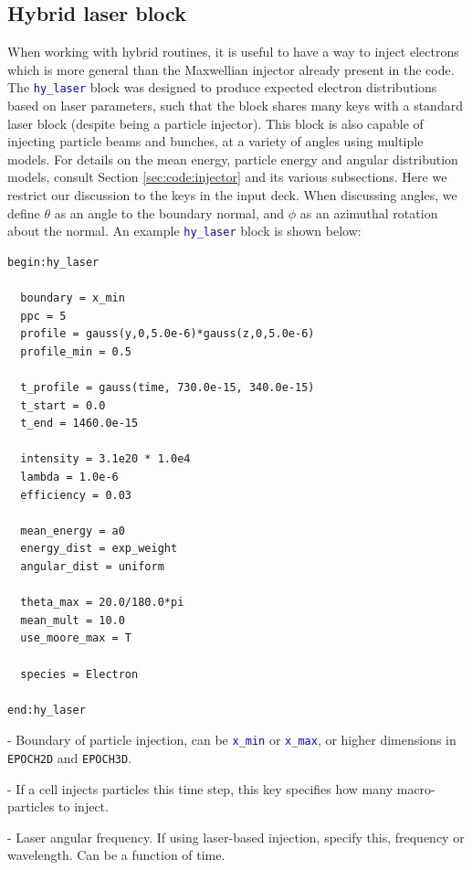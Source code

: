 \documentclass[12pt]{article}
\numberwithin{equation}{section}
\begin{document}
\subsection{Hybrid laser block} \label{sec:user:hy_laser}

When working with hybrid routines, it is useful to have a way to inject electrons which is more general than the Maxwellian injector already present in the code. The \textcolor{blue}{\texttt{hy\_laser}} block was designed to produce expected electron distributions based on laser parameters, such that the block shares many keys with a standard laser block (despite being a particle injector). This block is also capable of injecting particle beams and bunches, at a variety of angles using multiple models. For details on the mean energy, particle energy and angular distribution models, consult Section \ref{sec:code:injector} and its various subsections. Here we restrict our discussion to the keys in the input deck. When discussing angles, we define $\theta$ as an angle to the boundary normal, and $\phi$ as an azimuthal rotation about the normal. An example \textcolor{blue}{\texttt{hy\_laser}} block is shown below:

\begin{lstlisting}[style=myInputDeck]
begin:hy_laser

  boundary = x_min
  ppc = 5
  profile = gauss(y,0,5.0e-6)*gauss(z,0,5.0e-6)
  profile_min = 0.5

  t_profile = gauss(time, 730.0e-15, 340.0e-15)
  t_start = 0.0
  t_end = 1460.0e-15

  intensity = 3.1e20 * 1.0e4
  lambda = 1.0e-6
  efficiency = 0.03 

  mean_energy = a0
  energy_dist = exp_weight
  angular_dist = uniform

  theta_max = 20.0/180.0*pi
  mean_mult = 10.0
  use_moore_max = T

  species = Electron

end:hy_laser
\end{lstlisting}

\bigskip {\large\textcolor{blue}{boundary}} - Boundary of particle injection, can be \textcolor{blue}{\texttt{x\_min}} or \textcolor{blue}{\texttt{x\_max}}, or higher dimensions in \texttt{EPOCH2D} and \texttt{EPOCH3D}.

\bigskip {\large\textcolor{blue}{ppc}} - If a cell injects particles this time step, this key specifies how many macro-particles to inject.

\bigskip {\large\textcolor{blue}{omega}} - Laser angular frequency. If using laser-based injection, specify this, frequency or wavelength. Can be a function of time.
\end{document}
